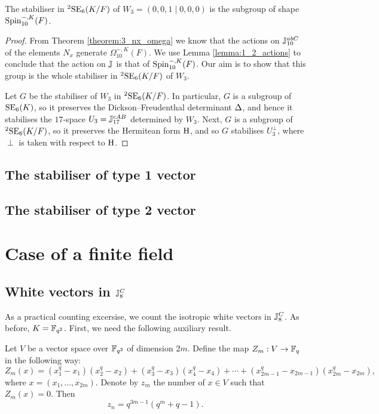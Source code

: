 \begin{theorem}
	The stabiliser in ${}^2\mathrm{SE}_6(K/F)$ of $W_3 = (0,0,1\mid 0,0,0)$ 
	is the subgroup of shape $\mathrm{Spin}_{10}^{-,K}(F)$. 
\end{theorem}

\begin{proof}
	From Theorem \ref{theorem:3_nx_omega} we know that the actions on $\mathbb{J}_{10}^{abC}$
	of the elements $N_x$ generate $\Omega_{10}^{-,K}(F)$. We use 
	Lemma \ref{lemma:1_2_actions} to conclude that the action on $\mathbb{J}$ is that of
	$\mathrm{Spin}_{10}^{-,K}(F)$. Our aim is to show that this group is the whole stabiliser
	in ${}^2\mathrm{SE}_6(K/F)$ of $W_3$.
	
	Let $G$ be the stabiliser of $W_3$ in ${}^2\mathrm{SE}_6(K/F)$. In particular, $G$ is 
	a subgroup of $\mathrm{SE}_6(K)$, so it preserves the Dickson--Freudenthal determinant
	$\Delta$, and hence it stabilises the $17$-space $U_3 = \mathbb{J}_{17}^{cAB}$ 
	determined by $W_3$. Next, $G$
	is a subgroup of ${}^2\mathrm{SE}_6(K/F)$, so it preserves the Hermitean form $\mathrm{H}$,
	and so $G$ stabilises $U_3^{\perp}$, where $\perp$ is taken with respect to $\mathrm{H}$. 
\end{proof}

\subsection{The stabiliser of type 1 vector}
\subsection{The stabiliser of type 2 vector}

\section{Case of a finite field}
\subsection{White vectors in $\mathbb{J}_8^C$}

As a practical counting excersise, we count the isotropic white vectors in $\mathbb{J}_{8}^{C}$.
As before, $K = \mathbb{F}_{q^2}$. First, we need the following auxiliary result.

\begin{lemma}
		\label{lemma:zn}
		Let $V$ be a vector space over $\mathbb{F}_{q^2}$ of dimension $2m$. 
		Define the map $Z_m: V \rightarrow \mathbb{F}_q$ in the following way:
		\begin{equation*}
			Z_m(x) = (x_1^q - x_1) (x_2^q - x_2) + (x_3^q - x_3) (x_4^q - x_4) + \cdots +
			(x_{2m-1}^q-x_{2m-1}) (x_{2m}^q - x_{2m}),
		\end{equation*}
		where $x = (x_1, ..., x_{2m})$. 
		Denote by $z_m$ the number of $x\in V$ such that $Z_m(x) = 0$. Then
		\begin{equation*}
			z_n = q^{3m-1}(q^m+q-1).
		\end{equation*}
\end{lemma}

